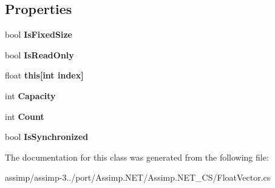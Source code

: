 \subsection*{Properties}
\begin{DoxyCompactItemize}
\item 
\hypertarget{class_float_vector_a0919ada024521df95ee83f3743ced01b}{bool {\bfseries Is\+Fixed\+Size}}\label{class_float_vector_a0919ada024521df95ee83f3743ced01b}

\item 
\hypertarget{class_float_vector_a1c3372059d169942bce1a50ae3a871c5}{bool {\bfseries Is\+Read\+Only}}\label{class_float_vector_a1c3372059d169942bce1a50ae3a871c5}

\item 
\hypertarget{class_float_vector_a8e87610898d7e21753eb0c0cd8ef7a7a}{float {\bfseries this\mbox{[}int index\mbox{]}}}\label{class_float_vector_a8e87610898d7e21753eb0c0cd8ef7a7a}

\item 
\hypertarget{class_float_vector_a31471a9ce0b94d5f2541a3e1b8b3be39}{int {\bfseries Capacity}}\label{class_float_vector_a31471a9ce0b94d5f2541a3e1b8b3be39}

\item 
\hypertarget{class_float_vector_af01e8bfd71a20139c6e6ac769fb64878}{int {\bfseries Count}}\label{class_float_vector_af01e8bfd71a20139c6e6ac769fb64878}

\item 
\hypertarget{class_float_vector_a2bfc074d7c7f55c3d20a7cb7dbd14bbc}{bool {\bfseries Is\+Synchronized}}\label{class_float_vector_a2bfc074d7c7f55c3d20a7cb7dbd14bbc}

\end{DoxyCompactItemize}


The documentation for this class was generated from the following file\+:\begin{DoxyCompactItemize}
\item 
assimp/assimp-\/3../port/\+Assimp.\+N\+E\+T/\+Assimp.\+N\+E\+T\+\_\+\+C\+S/Float\+Vector.\+cs\end{DoxyCompactItemize}

